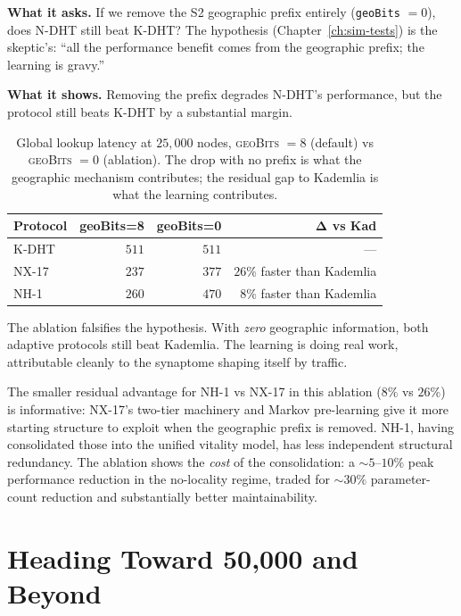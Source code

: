\documentclass[twoside,nobib]{tufte-book}
\newcommand{\NDHT}{N-DHT\xspace}
\newcommand{\KDHT}{K-DHT\xspace}
\begin{document}
\textbf{What it asks.} If we remove the S2 geographic prefix
entirely (\texttt{geoBits} $= 0$), does \NDHT still beat
\KDHT? The hypothesis (Chapter~\ref{ch:sim-tests}) is the
skeptic's: ``all the performance benefit comes from the
geographic prefix; the learning is gravy.''

\textbf{What it shows.} Removing the prefix degrades \NDHT's
performance, but the protocol still beats \KDHT by a
substantial margin.

\begin{table}[h]
\centering
\caption{Global lookup latency at $25{,}000$ nodes,
\textsc{geoBits} $= 8$ (default) vs \textsc{geoBits} $= 0$
(ablation). The drop with no prefix is what the geographic
mechanism contributes; the residual gap to Kademlia is what
the learning contributes.}
\label{tab:geobits-ablation}
\small
\begin{tabular}{@{}lrrr@{}}
\toprule
\textbf{Protocol} & \textbf{geoBits=8} & \textbf{geoBits=0} & \textbf{Δ vs Kad} \\
\midrule
\KDHT   & $511$ & $511$ & --- \\
NX-17   & $237$ & $377$ & $26\%$ faster than Kademlia \\
NH-1    & $260$ & $470$ & $8\%$ faster than Kademlia \\
\bottomrule
\end{tabular}
\end{table}

The ablation falsifies the hypothesis. With \emph{zero}
geographic information, both adaptive protocols still beat
Kademlia. The learning is doing real work, attributable
cleanly to the synaptome shaping itself by traffic.

The smaller residual advantage for NH-1 vs NX-17 in this
ablation ($8\%$ vs $26\%$) is informative: NX-17's two-tier
machinery and Markov pre-learning give it more starting
structure to exploit when the geographic prefix is removed. NH-1,
having consolidated those into the unified vitality model, has
less independent structural redundancy. The ablation shows the
\emph{cost} of the consolidation: a $\sim 5$--$10\%$ peak
performance reduction in the no-locality regime, traded for
$\sim 30\%$ parameter-count reduction and substantially better
maintainability.

\section{Heading Toward 50,000 and Beyond}
\end{document}
